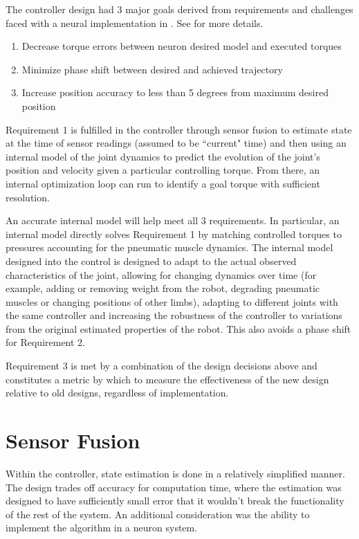 The controller design had 3 major goals derived from
requirements and challenges faced with a neural implementation in
\cite{HuntPhDThesis}. See  for more details.

\begin{enumerate}
\item Decrease torque errors between neuron desired model and executed torques
\item Minimize phase shift between desired and achieved trajectory
\item Increase position accuracy to less than 5 degrees from maximum desired
position
\end{enumerate}

Requirement 1 is fulfilled in
the controller through sensor fusion to estimate state at the time of sensor
readings (assumed to be ``current" time) and then using an internal model of the
joint dynamics to predict the evolution of the joint's position and velocity
given a particular controlling torque. From there, an internal optimization loop
can run to identify a goal torque with sufficient resolution.

An accurate internal model will help meet all 3 requirements. In particular, an
internal model directly solves Requirement 1 by matching controlled torques to
pressures accounting for the pneumatic muscle dynamics. The internal model
designed into the control is designed to adapt to the actual observed
characteristics of the joint, allowing for changing dynamics over time (for
example, adding or removing weight from the robot, degrading pneumatic muscles
or changing positions of other limbs),
adapting to different joints with the same controller and increasing the
robustness of the controller to variations from the original estimated
properties of the robot. This also avoids a phase shift for Requirement 2. 

Requirement 3 is met by a combination of the design decisions above and
constitutes a metric by which to measure the effectiveness of the new design
relative to old designs, regardless of implementation.

\section{Sensor Fusion}

Within the controller, state estimation is done in a relatively simplified
manner. The design trades off accuracy for computation time, where the 
estimation was designed to have sufficiently small error that it wouldn't 
break the functionality of the rest of the system. An additional consideration
was the ability to implement the algorithm in a neuron system.

